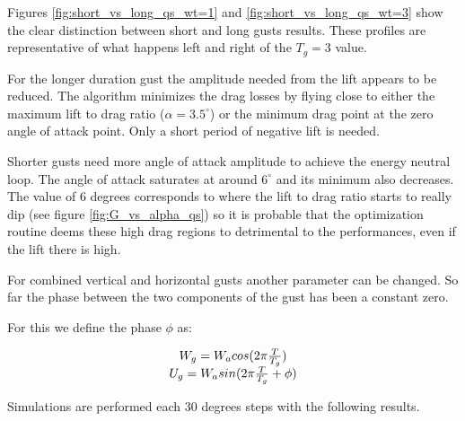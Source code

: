 \par Figures \ref{fig:short_vs_long_qs_wt=1} and \ref{fig:short_vs_long_qs_wt=3} show the clear distinction between short and long gusts results.
These profiles are representative of what happens left and right of the $T_g=3$ value.

\par For the longer duration gust the amplitude needed from the lift appears to be reduced.
The algorithm minimizes the drag losses by flying close to either the maximum lift to drag ratio ($\alpha = 3.5 ^{\circ}$) or the minimum drag point at the zero angle of attack point.
Only a short period of negative lift is needed.

\par Shorter gusts need more angle of attack amplitude to achieve the energy neutral loop.
The angle of attack saturates at around $6^{\circ}$ and its minimum also decreases.
The value of 6 degrees corresponds to where the lift to drag ratio starts to really dip (see figure \ref{fig:G_vs_alpha_qs}) so it is probable that the optimization routine deems these high drag regions to detrimental to the performances, even if the lift there is high. 


\FloatBarrier
{}
For combined vertical and horizontal gusts another parameter can be changed.
So far the phase between the two components of the gust has been a constant zero.

\par For this we define the phase $\phi$ as:

\begin{equation}
  \begin{array}[c]{c}
    W_g=W_a cos(2\pi \frac{T}{T_g}) \\
    U_g=W_a sin(2\pi \frac{T}{T_g} + \phi)
  \end{array}
  \label{eqn:combined_gust_phase}
\end{equation}

Simulations are performed each 30 degrees steps with the following results.

